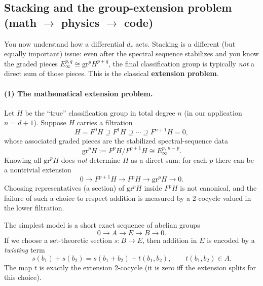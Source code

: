 \documentclass{SciPost}
\begin{document}
\subsection{Stacking and the group-extension problem (math $\to$ physics $\to$ code)}
\label{subsec:stacking-extension}

You now understand how a differential $d_r$ acts. Stacking is a different (but equally important) issue:
even after the spectral sequence stabilizes and you know the graded pieces $E_{\infty}^{p,q}\cong \mathrm{gr}^p H^{p+q}$, the final classification group is typically \emph{not} a direct sum of those pieces.
This is the classical \textbf{extension problem}.

\paragraph{(1) The mathematical extension problem.}
Let $H$ be the ``true'' classification group in total degree $n$ (in our application $n=d+1$). Suppose $H$ carries a filtration
\begin{equation}
H = F^{0}H \supseteq F^{1}H \supseteq \cdots \supseteq F^{n+1}H = 0,
\end{equation}
whose associated graded pieces are the stabilized spectral-sequence data
\begin{equation}
\mathrm{gr}^{p}H := F^{p}H/F^{p+1}H \cong E_{\infty}^{p,\,n-p}.
\end{equation}
Knowing all $\mathrm{gr}^{p}H$ does \emph{not} determine $H$ as a direct sum: for each $p$ there can be a nontrivial extension
\begin{equation}
0\to F^{p+1}H \to F^{p}H \to \mathrm{gr}^{p}H \to 0.
\end{equation}
Choosing representatives (a section) of $\mathrm{gr}^{p}H$ inside $F^{p}H$ is not canonical, and the failure of such a choice to respect addition is measured by a 2-cocycle valued in the lower filtration.

The simplest model is a short exact sequence of abelian groups
\begin{equation}
0 \to A \to E \to B \to 0.
\end{equation}
If we choose a set-theoretic section $s:B\to E$, then addition in $E$ is encoded by a \emph{twisting} term
\begin{equation}
s(b_1)+s(b_2) = s(b_1+b_2) + t(b_1,b_2),\qquad t(b_1,b_2)\in A.
\end{equation}
The map $t$ is exactly the extension 2-cocycle (it is zero iff the extension splits for this choice).
\end{document}
